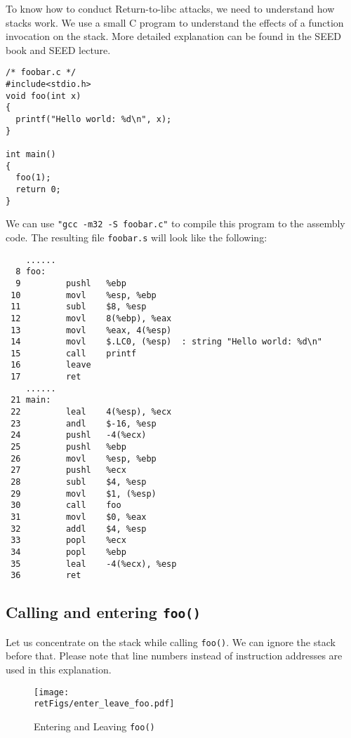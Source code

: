 To know how to conduct Return-to-libc attacks, we need to 
understand how stacks work.  We use a small C program to understand 
the effects of a function invocation on the stack. More detailed 
explanation can be found in the SEED book and SEED lecture. 


\begin{lstlisting}
/* foobar.c */
#include<stdio.h>
void foo(int x)
{
  printf("Hello world: %d\n", x);
}

int main()
{
  foo(1);
  return 0;
}
\end{lstlisting}

We can use {\tt "gcc -m32 -S foobar.c"} to
compile this program to the assembly code.
The resulting file {\tt foobar.s} will look like the following:


\begin{lstlisting}
    ......
  8 foo:
  9         pushl   %ebp
 10         movl    %esp, %ebp
 11         subl    $8, %esp
 12         movl    8(%ebp), %eax   
 13         movl    %eax, 4(%esp)
 14         movl    $.LC0, (%esp)  : string "Hello world: %d\n"
 15         call    printf
 16         leave
 17         ret
    ......
 21 main:
 22         leal    4(%esp), %ecx
 23         andl    $-16, %esp
 24         pushl   -4(%ecx)
 25         pushl   %ebp
 26         movl    %esp, %ebp
 27         pushl   %ecx
 28         subl    $4, %esp
 29         movl    $1, (%esp)
 30         call    foo
 31         movl    $0, %eax
 32         addl    $4, %esp
 33         popl    %ecx
 34         popl    %ebp
 35         leal    -4(%ecx), %esp
 36         ret
\end{lstlisting}
 


\subsection{Calling and entering {\tt foo()}}

Let us concentrate on the stack while calling {\tt foo()}. We can ignore the stack
before that. Please note that line numbers instead of instruction addresses are
used in this explanation. 



\begin{figure}[htb]
	\centering
	\texttt{[image: \\retFigs/enter\_leave\_foo.pdf]}
	\caption{Entering and Leaving {\tt foo()}}
	\label{fig:enter_leave_foo}
\end{figure}


